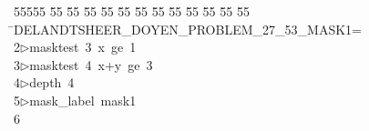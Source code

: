 %
%
\begin{tabbing}
55555 \= 55 \= 55 \= 55 \= 55 \= 55 \= 55 \= 55 \= 55 \= 55 \= 55 \= 55 \= 55 \= \>DELANDTSHEER\_DOYEN\_PROBLEM\_27\_53\_MASK1=\\[0pt]
2\>$\triangleright$\>masktest\ 3\ x\ ge\ 1\ \\[0pt]
3\>$\triangleright$\>masktest\ 4\ x+y\ ge\ 3\ \\[0pt]
4\>$\triangleright$\>depth\ 4\ \\[0pt]
5\>$\triangleright$\>mask\_label\ mask1\\[0pt]
6\>\end{tabbing}
